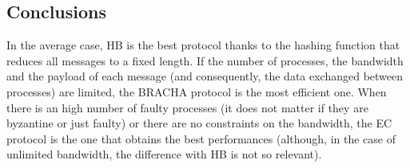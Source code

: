 \documentclass[12pt]{article}
\begin{document}
\subsection{Conclusions}
In the average case, HB is the best protocol thanks to the hashing function that reduces all messages to a fixed length. If the number of processes, the bandwidth and the payload of each message (and consequently, the data exchanged between processes) are limited, the BRACHA protocol is the most efficient one. 
When there is an high number of faulty processes (it does not matter if they are byzantine or just faulty) or there are no constraints on the bandwidth, the EC protocol is the one that obtains the best performances (although, in the case of unlimited bandwidth, the difference with HB is not so relevant).
\end{document}
